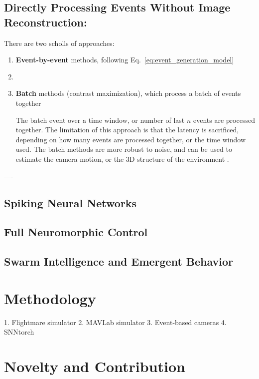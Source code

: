 \documentclass{article}
\begin{document}
\subsection{Directly Processing Events Without Image Reconstruction:} There are two scholls of approaches: 
\begin{enumerate}
    \item \textbf{Event-by-event} methods, following Eq.~\eqref{eq:event_generation_model} 
    \item 
    \item \textbf{Batch} methods (contrast maximization), which process a batch of events together
    
   

    The batch event over a time window, or number of last $n$ events are processed together. The limitation of this approach is that the latency is sacrificed, depending on how many events are processed together, or the time window used. The batch methods are more robust to noise, and can be used to estimate the camera motion, or the 3D structure of the environment \cite{rebecqHighSpeedHigh2019, DenseContinuousTimeOptical, bhattacharyaMonocularEventBasedVision2024}.

\end{enumerate}

----

\subsection{Spiking Neural Networks}
\subsection{Full Neuromorphic Control}
\subsection{Swarm Intelligence and Emergent Behavior}

\section{Methodology}

1. Flightmare simulator
2. MAVLab simulator
3. Event-based cameras
4. SNNtorch


\section{Novelty and Contribution}

\printbibliography[title={\section{References}}]
\end{document}

